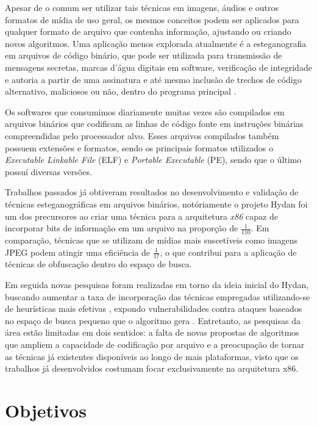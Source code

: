 Apesar de o comum ser utilizar tais técnicas em imagens, áudios e outros formatos de mídia de uso geral, os mesmos conceitos podem ser aplicados para qualquer formato de arquivo que contenha informação, ajustando ou criando novos algoritmos. Uma aplicação menos explorada atualmente é a esteganografia em arquivos de código binário, que pode ser utilizada para transmissão de mensagens secretas, marcas d'água digitais em software, verificação de integridade e autoria a partir de uma assinatura e até mesmo inclusão de trechos de código alternativo, maliciosos ou não, dentro do programa principal \cite{Weaver}.

Os softwares que consumimos diariamente muitas vezes são compilados em arquivos binários que codificam as linhas de código fonte em instruções binárias compreendidas pelo processador alvo. Esses arquivos compilados também possuem extensões e formatos, sendo os principais formatos utilizados o \emph{Executable Linkable File} (ELF) e \textit{Portable Executable} (PE), sendo que o último possuí diversas versões.

Trabalhos passados já obtiveram resultados no desenvolvimento e validação de técnicas esteganográficas em arquivos binários, notóriamente o projeto Hydan \cite{Hydan} foi um dos precursores ao criar uma técnica para a arquitetura \emph{x86} capaz de incorporar bits de informação em um arquivo na proporção de $\frac{1}{110}$. Em comparação, técnicas que se utilizam de mídias mais suscetíveis como imagens JPEG podem atingir uma eficiência de $\frac{1}{17}$, o que contribui para a aplicação de técnicas de obfuscação dentro do espaço de busca.

Em seguida novas pesquisas foram realizadas em torno da ideia inicial do Hydan, buscando aumentar a taxa de incorporação das técnicas empregadas utilizando-se de heurísticas mais efetivas \cite{ICISC04}, expondo vulnerabilidades contra ataques baseados no espaço de busca pequeno que o algoritmo gera \cite{Wright2020DetectingHS}. Entretanto, as pesquisas da área estão limitadas em dois sentidos: a falta de novas propostas de algoritmos que ampliem a capacidade de codificação por arquivo e a preocupação de tornar as técnicas já existentes disponíveis ao longo de mais plataformas, visto que os trabalhos já desenvolvidos costumam focar exclusivamente na arquitetura x86.

\section{Objetivos}

